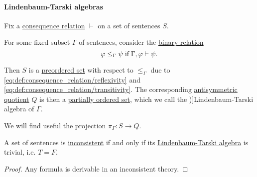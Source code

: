 \paragraph{Lindenbaum-Tarski algebras}

\begin{definition}\label{def:lindenbaum_tarski_algebra}
  Fix a \hyperref[def:consequence_relation]{consequence relation} \( {\vdash} \) on a set of sentences \( S \).

  For some fixed subset \( \Gamma \) of sentences, consider the \hyperref[def:binary_relation]{binary relation}
  \begin{equation*}
    \varphi \leq_\Gamma \psi \T{if} \Gamma, \varphi \vdash \psi.
  \end{equation*}

  Then \( S \) is a \hyperref[def:preordered_set]{preordered set} with respect to \( \leq_\Gamma \) due to \eqref{eq:def:consequence_relation/reflexivity} and \eqref{eq:def:consequence_relation/transitivity}. The corresponding \hyperref[def:antisymmetric_quotient]{antisymmetric quotient} \( Q \) is then a \hyperref[def:partially_ordered_set]{partially ordered set}, which we call the \term[ru=алгебра Линденбаума-Тарского, en=Lindenbaum-Tarski algebra (\cite[def. 6.3.1]{CitkinMuravitsky2021})]{Lindenbaum-Tarski algebra} of \( \Gamma \).
\end{definition}
\begin{comments}
  \item We will find useful the projection \( \pi_\Gamma: S \to Q \).
\end{comments}

\begin{proposition}\label{thm:inconsistent_lindenbaum_tarski_algebra}
  A set of sentences is \hyperref[def:consistent_set_of_sentences]{inconsistent} if and only if its \hyperref[def:lindenbaum_tarski_algebra]{Lindenbaum-Tarski algebra} is trivial, i.e. \( T = F \).
\end{proposition}
\begin{proof}
  Any formula is derivable in an inconsistent theory.
\end{proof}

